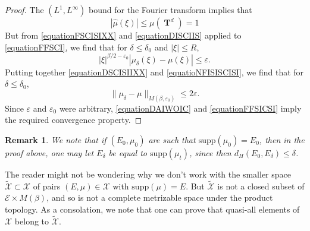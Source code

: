 \documentclass[12pt,reqno]{article}
\numberwithin{equation}{section}
\DeclareMathOperator{\TT}{\mathbf{T}}
\newtheorem{remark}{Remark}
\begin{document}
\begin{proof}
    The $(L^1,L^\infty)$ bound for the Fourier transform implies that
    \begin{equation} \label{equationFSCISIXX}
        |\widehat{\mu}(\xi)| \leq \mu(\TT^d) = 1
    \end{equation}
    But from \eqref{equationFSCISIXX} and \eqref{equationDISCIIS} applied to \eqref{equationFFSCI}, we find that for $\delta \leq \delta_0$ and $|\xi| \leq R$,
    \begin{equation} \label{equatioNFISISCISI}
        |\xi|^{\beta/2 - \varepsilon_0} |\mu_\delta(\xi) - \mu(\xi)| \leq \varepsilon.
    \end{equation}
    Putting together \eqref{equationDSCISIIXX} and \eqref{equatioNFISISCISI}, we find that for $\delta \leq \delta_0$,
    \begin{equation} \label{equationDAIWOIC}
        \| \mu_\delta - \mu \|_{M(\beta,\varepsilon_0)} \leq 2\varepsilon.
    \end{equation}
    Since $\varepsilon$ and $\varepsilon_0$ were arbitrary, \eqref{equationDAIWOIC} and \eqref{equationFFSICSI} imply the required convergence property.
\end{proof}

\begin{remark} \label{remarkDOIWJDIOWJ2}
    We note that if $(E_0,\mu_0)$ are such that $\text{supp}(\mu_0) = E_0$, then in the proof above, one may let $E_\delta$ be equal to $\text{supp}(\mu_t)$, since then $d_H(E_0,E_\delta) \leq \delta$.
\end{remark}

The reader might not be wondering why we don't work with the smaller space $\tilde{\mathcal{X}} \subset \mathcal{X}$ of pairs $(E,\mu) \in \mathcal{X}$ with $\text{supp}(\mu) = E$. But $\tilde{\mathcal{X}}$ is not a closed subset of $\mathcal{E} \times M(\beta)$, and so is not a complete metrizable space under the product topology. As a consolation, we note that one can prove that quasi-all elements of $\mathcal{X}$ belong to $\tilde{\mathcal{X}}$.
\end{document}
